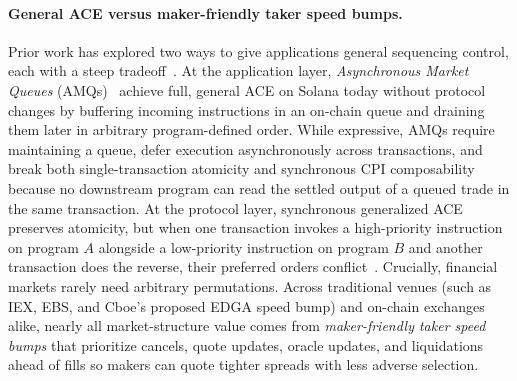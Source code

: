 \documentclass[10pt,a4paper]{article}
\begin{document}
\paragraph{General ACE versus maker-friendly taker speed bumps.}
Prior work has explored two ways to give applications general sequencing control, each with a steep tradeoff~\cite{CP25,Can26}. At the application layer, \emph{Asynchronous Market Queues} (AMQs)~\cite{CP25} achieve full, general ACE on Solana today without protocol changes by buffering incoming instructions in an on-chain queue and draining them later in arbitrary program-defined order. While expressive, AMQs require maintaining a queue, defer execution asynchronously across transactions, and break both single-transaction atomicity and synchronous CPI composability because no downstream program can read the settled output of a queued trade in the same transaction. At the protocol layer, synchronous generalized ACE preserves atomicity, but when one transaction invokes a high-priority instruction on program $A$ alongside a low-priority instruction on program $B$ and another transaction does the reverse, their preferred orders conflict~\cite{CP25,Can26,KW26c}. Crucially, financial markets rarely need arbitrary permutations. Across traditional venues (such as IEX, EBS, and Cboe's proposed EDGA speed bump) and on-chain exchanges alike, nearly all market-structure value comes from \emph{maker-friendly taker speed bumps} that prioritize cancels, quote updates, oracle updates, and liquidations ahead of fills so makers can quote tighter spreads with less adverse selection.
\end{document}
